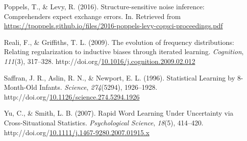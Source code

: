 \documentclass[10pt, letterpaper]{article}
\newenvironment{CSLReferences}%
  {}%
  {\par}
\begin{document}
\begin{CSLReferences}{1}{0}
\leavevmode{}%
Poppels, T., \& Levy, R. (2016). Structure-sensitive noise inference:
Comprehenders expect exchange errors. In. Retrieved from
\url{https://tpoppels.github.io/files/2016-poppels-levy-cogsci-proceedings.pdf}

\leavevmode{}%
Reali, F., \& Griffiths, T. L. (2009). The evolution of frequency
distributions: Relating regularization to inductive biases through
iterated learning. \emph{Cognition}, \emph{111}(3), 317--328.
http://doi.org/\href{https://doi.org/10.1016/j.cognition.2009.02.012}{10.1016/j.cognition.2009.02.012}

\leavevmode{}%
Saffran, J. R., Aslin, R. N., \& Newport, E. L. (1996). Statistical
Learning by 8-Month-Old Infants. \emph{Science}, \emph{274}(5294),
1926--1928.
http://doi.org/\href{https://doi.org/10.1126/science.274.5294.1926}{10.1126/science.274.5294.1926}

\leavevmode{}%
Yu, C., \& Smith, L. B. (2007). Rapid Word Learning Under Uncertainty
via Cross-Situational Statistics. \emph{Psychological Science},
\emph{18}(5), 414--420.
http://doi.org/\href{https://doi.org/10.1111/j.1467-9280.2007.01915.x}{10.1111/j.1467-9280.2007.01915.x}

\end{CSLReferences}


\end{document}
